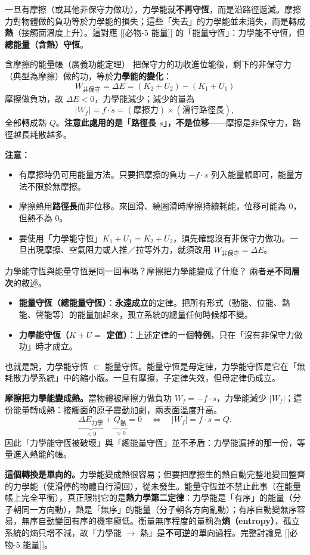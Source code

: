 \documentclass[11pt]{article}
\begin{document}
一旦有摩擦（或其他非保守力做功），力學能就\textbf{不再守恆}，而是沿路徑遞減。摩擦力對物體做的負功等於力學能的損失；這些「失去」的力學能並未消失，而是轉成\textbf{熱}（接觸面溫度上升）。這對應 [[必物-5 能量]] 的「能量守恆」：力學能不守恆，但\textbf{總能量（含熱）守恆}。

\begin{補充框}{含摩擦的能量帳（廣義功能定理）}
把保守力的功收進位能後，剩下的非保守力（典型為摩擦）做的功，等於\textbf{力學能的變化}：
$$\boxed{\;W_{\text{非保守}}=\Delta E=(K_2+U_2)-(K_1+U_1)\;}$$
摩擦做負功，故 $\Delta E<0$，力學能減少；減少的量為
$$|W_f|=f\cdot s=(\text{摩擦力})\times(\text{滑行路徑長}),$$
全部轉成熱 $Q$。\textbf{注意此處用的是「路徑長 $s$」，不是位移}——摩擦是非保守力，路徑越長耗散越多。
\end{補充框}

\textbf{注意：}
\begin{itemize}\setlength{\itemsep}{1pt}
\item 有摩擦時仍可用能量方法。只要把摩擦的負功 $-f\cdot s$ 列入能量帳即可，能量方法不限於無摩擦。
\item 摩擦熱用\textbf{路徑長}而非位移。來回滑、繞圈滑時摩擦持續耗能，位移可能為 0，但熱不為 0。
\item 要使用「力學能守恆」$K_1+U_1=K_2+U_2$，須先確認沒有非保守力做功。一旦出現摩擦、空氣阻力或人推／拉等外力，就須改用 $W_{\text{非保守}}=\Delta E$。
\end{itemize}

\begin{延伸框}{力學能守恆與能量守恆是同一回事嗎？摩擦把力學能變成了什麼？}
兩者是\textbf{不同層次}的敘述。
\begin{itemize}\setlength{\itemsep}{1pt}
\item \textbf{能量守恆（總能量守恆）}：\textbf{永遠成立}的定律。把所有形式（動能、位能、熱能、聲能等）的能量加起來，孤立系統的總量任何時候都不變。
\item \textbf{力學能守恆（$K+U=$ 定值）}：上述定律的一個\textbf{特例}，只在「沒有非保守力做功」時才成立。
\end{itemize}
也就是說，力學能守恆 $\subset$ 能量守恆。能量守恆是母定律，力學能守恆是它在「無耗散力學系統」中的縮小版。一旦有摩擦，子定律失效，但母定律仍成立。

\textbf{摩擦把力學能變成熱。}當物體被摩擦力做負功 $W_f=-f\cdot s$，力學能減少 $|W_f|$；這份能量轉成熱：接觸面的原子震動加劇，兩表面溫度升高。
$$\underbrace{\Delta E_{\text{力學}}}_{<0}+\underbrace{Q_{\text{熱}}}_{>0}=0 \quad\Longleftrightarrow\quad |W_f|=f\cdot s=Q.$$
因此「力學能守恆被破壞」與「總能量守恆」並不矛盾：力學能漏掉的那一份，等量進入熱能的帳。

\textbf{這個轉換是單向的。}力學能變成熱很容易；但要把摩擦生的熱自動完整地變回整齊的力學能（使滑停的物體自行滑回），從未發生。能量守恆並不禁止此事（在能量帳上完全平衡），真正限制它的是\textbf{熱力學第二定律}：力學能是「有序」的能量（分子朝同一方向動），熱是「無序」的能量（分子朝各方向亂動）；有序自動變無序容易，無序自動變回有序的機率極低。衡量無序程度的量稱為\textbf{熵（entropy）}，孤立系統的熵只增不減，故「力學能 $\rightarrow$ 熱」是\textbf{不可逆}的單向過程。完整討論見 [[必物-5 能量]]。
\end{延伸框}
\end{document}
